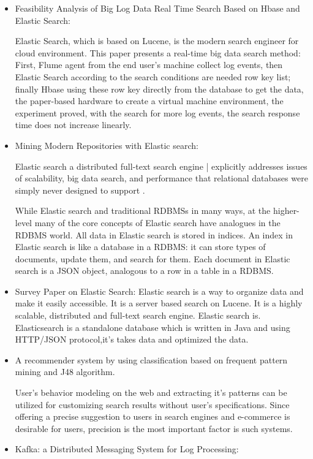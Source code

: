 \documentclass[oneside,a4paper,12pt]{book}
\begin{document}
\begin{enumerate}
\begin{itemize}
\item Feasibility Analysis of Big Log Data Real Time Search Based on Hbase and Elastic Search: 
 
Elastic Search, which is based on Lucene, is the modern search engineer for cloud environment. This paper presents a real-time big data search method: First, Flume agent from the end user's machine collect log events, then Elastic Search according to the search conditions are needed row key list; finally Hbase using these row key directly from the database to get the data, the paper-based hardware to create a virtual machine environment, the experiment proved, with the search for more log events, the search response time does not increase linearly.

\item Mining Modern Repositories with Elastic search: 
 
Elastic search  a distributed full-text search engine | explicitly addresses issues of scalability, big data search, and performance that relational databases were simply never designed to support .
 
While Elastic search and traditional RDBMSs  in many ways, at the higher-level many of the core concepts of Elastic search have analogues in the RDBMS world. All data in Elastic search is stored in indices. An index in Elastic search is like a database in a RDBMS: it can store  types of documents, update them, and search for them. Each document in Elastic search is a JSON object, analogous to a row in a table in a 
RDBMS. 
\item Survey Paper on Elastic Search:
Elastic search is a way to organize data and make it easily accessible. It is a server based search on Lucene. It is a highly scalable, distributed and full-text search engine. Elastic search is. Elasticsearch is a standalone database which is written in Java and using HTTP/JSON protocol,it’s takes data and optimized the data.
\item A recommender system by using classification based on frequent pattern mining and J48 algorithm.

User’s behavior modeling on the web and extracting it’s patterns can be utilized for customizing search results without user’s specifications. Since offering a precise suggestion to users in search engines and e-commerce is desirable for users, precision is the most important factor is such systems.
\item Kafka: a Distributed Messaging System for Log Processing: 
 

\end{itemize}
\end{enumerate}
\end{document}
